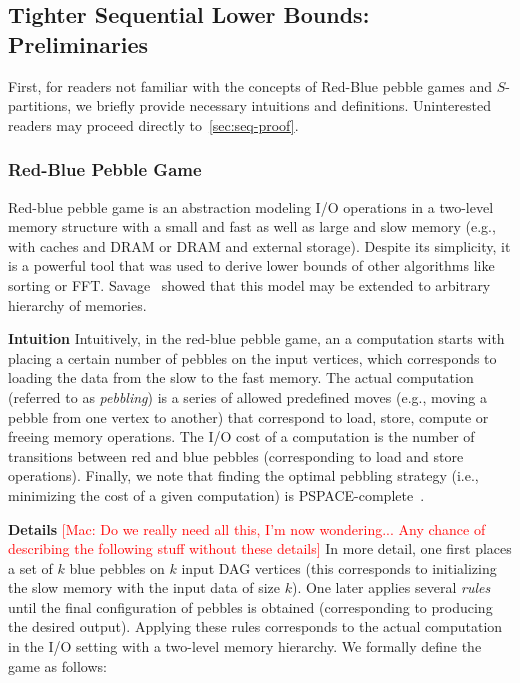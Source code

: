 \documentclass[sigplan,review,anonymous]{acmart}\settopmatter{printfolios=true,printccs=false,printacmref=false}
\newcommand\mac[1]{\textcolor{red}{[Mac: #1]}}
\newcommand{\macb}[1]{\textbf{\textsf{#1}}}
\begin{document}
%
%
%

%

\subsection{Tighter Sequential Lower Bounds: Preliminaries}

First, for readers not familiar with the concepts of Red-Blue pebble games and
$S$-partitions, we briefly provide necessary intuitions and definitions.
Uninterested readers may proceed directly to~\cref{sec:seq-proof}.

\subsubsection{Red-Blue Pebble Game}

Red-blue pebble game is an abstraction modeling I/O operations in a two-level
memory structure with a small and fast as well as large and slow memory (e.g.,
with caches and DRAM or DRAM and external storage). Despite its simplicity, it
is a powerful tool that was used to derive lower bounds of other algorithms
like sorting or FFT.  Savage~\cite{redblueHierarchy} showed that this model may
be extended to arbitrary hierarchy of memories.
%

\macb{Intuition}
%
Intuitively, in the red-blue pebble game, an a computation starts with placing a
certain number of pebbles on the input vertices, which corresponds to loading
the data from the slow to the fast memory. The actual computation (referred to
as \emph{pebbling}) is a series of allowed predefined moves (e.g., moving a
pebble from one vertex to another) that correspond to load, store, compute or
freeing memory operations.
%
The I/O cost of a computation is the number of transitions between red and blue
pebbles (corresponding to load and store operations).
%
Finally, we note that finding the optimal pebbling strategy (i.e., minimizing
the cost of a given computation) is PSPACE-complete~\cite{redbluecomplete,
pebblegameregister}. 

\macb{Details}
%
\mac{Do we really need all this, I'm now wondering... Any chance of describing
the following stuff without these details}
%
In more detail, one first places a set of $k$ blue pebbles on $k$ input DAG
vertices (this corresponds to initializing the slow memory with the input data
of size $k$). One later applies several \emph{rules} until the final
configuration of pebbles is obtained (corresponding to producing the desired
output). Applying these rules corresponds to the actual computation in the I/O
setting with a two-level memory hierarchy. We formally define the game as 
follows:
\end{document}
